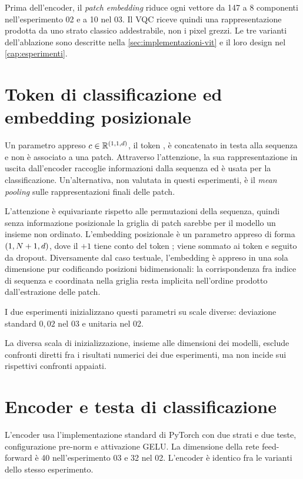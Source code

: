 Prima dell'encoder, il \emph{patch embedding} riduce ogni vettore da 147 a 8
componenti nell'esperimento 02 e a 10 nel 03. Il VQC riceve quindi una
rappresentazione prodotta da uno strato classico addestrabile, non i pixel
grezzi. Le tre varianti dell'ablazione sono descritte nella
\cref{sec:implementazioni-vit} e il loro design nel \cref{cap:esperimenti}.

\section{Token di classificazione ed embedding posizionale}
\label{sec:cls}

Un parametro appreso $c \in \mathbb{R}^{(1,1,d)}$, il token \code{[CLS]}, è
concatenato in testa alla sequenza e non è associato a una patch. Attraverso
l'attenzione, la sua rappresentazione in uscita dall'encoder raccoglie
informazioni dalla sequenza ed è usata per la classificazione. Un'alternativa,
non valutata in questi esperimenti, è il \emph{mean pooling} sulle
rappresentazioni finali delle patch.

L'attenzione è equivariante rispetto alle permutazioni della sequenza, quindi
senza informazione posizionale la griglia di patch sarebbe per il modello un
insieme non ordinato. L'embedding posizionale è un parametro appreso di forma
$(1, N + 1, d)$, dove il $+1$ tiene conto del token \code{[CLS]};
viene sommato ai token e seguito da dropout. Diversamente dal caso testuale,
l'embedding è appreso in una sola dimensione pur codificando posizioni
bidimensionali: la corrispondenza fra indice di sequenza e coordinata nella
griglia resta implicita nell'ordine prodotto dall'estrazione delle patch.

I due esperimenti inizializzano questi parametri su scale diverse: deviazione
standard $0{,}02$ nel 03 e unitaria nel 02.

\begin{limite}
La diversa scala di inizializzazione, insieme alle dimensioni dei modelli,
esclude confronti diretti fra i risultati numerici dei due esperimenti, ma non
incide sui rispettivi confronti appaiati.
\end{limite}

\section{Encoder e testa di classificazione}

L'encoder usa l'implementazione standard di PyTorch con due strati e due teste,
configurazione pre-norm e attivazione GELU. La dimensione della rete feed-forward
è 40 nell'esperimento 03 e 32 nel 02. L'encoder è identico fra le varianti dello
stesso esperimento.

